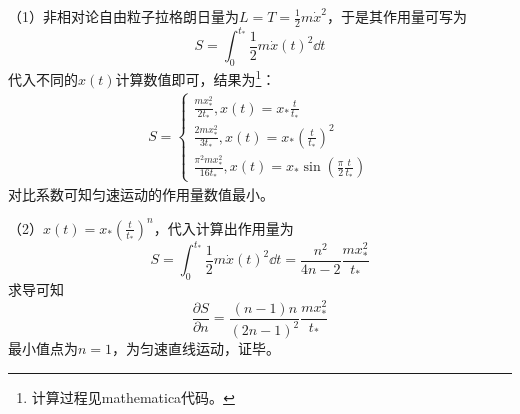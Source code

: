 \begin{solution}
	（1）非相对论自由粒子拉格朗日量为\(L=T=\frac{1}{2}m \dot{x}^2\)，于是其作用量可写为
	\[S=\int_{0}^{t_*}\frac{1}{2}m \dot{x}(t)^2 \dd t\]
	代入不同的\(x(t)\)计算数值即可，结果为\footnote{计算过程见mathematica代码。}：
	\begin{align*}
		S=\begin{cases}
			\frac{m x_*^2}{2 t_*},  x(t)=x_* \frac{t}{t_*}\\
			\frac{2 m x_*^2}{3 t_*}, x(t)=x_*\left(\frac{t}{t_*}\right)^2\\
			\frac{\pi ^2 m x_*^2}{16 t_*}, x(t)=x_*\sin{\left(\frac{\pi}{2} \frac{t}{t_*}\right)}
		\end{cases}
	\end{align*}
	对比系数可知匀速运动的作用量数值最小。
	
	（2）\(x(t)=x_*\left(\frac{t}{t_*}\right)^n\)，代入计算出作用量为
	\[S=\int_{0}^{t_*}\frac{1}{2}m \dot{x}(t)^2 \dd t=\frac{n^2}{4n-2}\frac{m x_*^2}{t_*}\]
	求导可知
	\[\frac{\partial S}{\partial n}=\frac{(n-1) n}{(2n-1)^2}\frac{m x_*^2}{t_*}\]
	最小值点为\(n=1\)，为匀速直线运动，证毕。
\end{solution}





